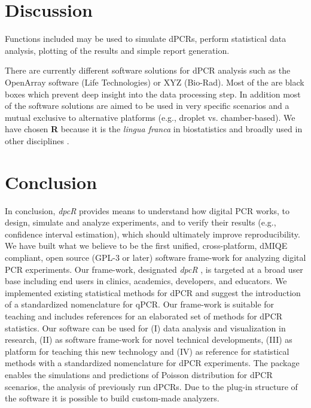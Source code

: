 \documentclass{bioinfo}
\begin{document}
\section{Discussion}

Functions included may be used to simulate dPCRs, perform statistical data 
analysis, plotting of the results and simple report generation. 

There are currently different software solutions for dPCR analysis such as the 
OpenArray software (Life Technologies) or XYZ (Bio-Rad). Most of the are black 
boxes which prevent deep insight into the data processing step. In addition most 
of the software solutions are aimed to be used in very specific scenarios and a 
mutual exclusive to alternative platforms (e.g., droplet vs. chamber-based). We 
have chosen \textbf{R} because it is the \textit{lingua franca} in biostatistics and broadly used 
in other disciplines \cite{rodiger_r_2015}.



%
%






\section{Conclusion}

In conclusion, \textit{dpcR} provides means to understand how digital PCR works, 
to design, simulate and analyze experiments, and to verify their results (e.g., 
confidence interval estimation), which should ultimately improve 
reproducibility. We have built what we believe to be the first unified, 
cross-platform, dMIQE compliant, open source (GPL-3 or later) software frame-work for 
analyzing digital PCR experiments. Our frame-work, designated \textit{dpcR} , is 
targeted at a broad user base including end users in clinics, academics, 
developers, and educators. We implemented existing statistical methods for dPCR 
and suggest the introduction of a standardized nomenclature for qPCR. Our 
frame-work is suitable for teaching and includes references for an elaborated 
set of methods for dPCR statistics. Our software can be used for (I) data 
analysis and visualization in research, (II) as software frame-work for novel 
technical developments, (III) as platform for teaching this new technology and 
(IV) as reference for statistical methods with a standardized nomenclature for 
dPCR experiments. The package enables the simulations and predictions of Poisson 
distribution for dPCR scenarios, the analysis of previously run dPCRs. Due to 
the plug-in structure of the software it is possible to build custom-made 
analyzers.
\end{document}
